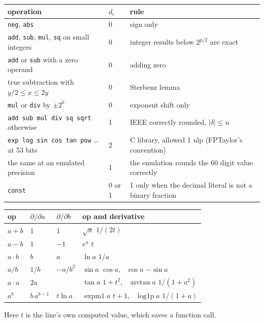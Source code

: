 \documentclass[11pt]{article}
\begin{document}
\begin{center}
\begin{tabularx}{\textwidth}{@{}llX@{}}
\toprule
operation & $d_i$ & rule \\
\midrule
\texttt{neg}, \texttt{abs} & 0 & sign only \\
\texttt{add}, \texttt{sub}, \texttt{mul}, \texttt{sq} on small integers & 0 & integer results below $2^{p/2}$ are exact \\
\texttt{add} or \texttt{sub} with a zero operand & 0 & adding zero \\
true subtraction with $y/2 \le x \le 2y$ & 0 & Sterbenz lemma \\
\texttt{mul} or \texttt{div} by $\pm 2^{k}$ & 0 & exponent shift only \\
\texttt{add sub mul div sq sqrt} otherwise & 1 & IEEE correctly rounded, $|\delta| \le u$ \\
\texttt{exp log sin cos tan pow} \ldots at 53 bits & 2 & C library, allowed 1 ulp (FPTaylor's convention) \\
the same at an emulated precision & 1 & the emulation rounds the 60 digit value correctly \\
\texttt{const} & 0 or 1 & 1 only when the decimal literal is not a binary fraction \\
\bottomrule
\end{tabularx}
\end{center}

\begin{center}
\begin{tabular}{@{}llll@{}}
\toprule
op & $\partial/\partial a$ & $\partial/\partial b$ & op and derivative \\
\midrule
$a+b$ & $1$ & $1$ & $\sqrt a$ \quad $1/(2t)$ \\
$a-b$ & $1$ & $-1$ & $e^{a}$ \quad $t$ \\
$a\cdot b$ & $b$ & $a$ & $\ln a$ \quad $1/a$ \\
$a/b$ & $1/b$ & $-a/b^{2}$ & $\sin a$ \quad $\cos a$, \ $\cos a$ \quad $-\sin a$ \\
$a\cdot a$ & $2a$ & & $\tan a$ \quad $1+t^{2}$, \ $\arctan a$ \quad $1/(1+a^2)$ \\
$a^{b}$ & $b\,a^{b-1}$ & $t\ln a$ & $\operatorname{expm1} a$ \quad $t+1$, \ $\operatorname{log1p} a$ \quad $1/(1+a)$ \\
\bottomrule
\end{tabular}
\end{center}
Here $t$ is the line's own computed value, which saves a function call.
\end{document}
